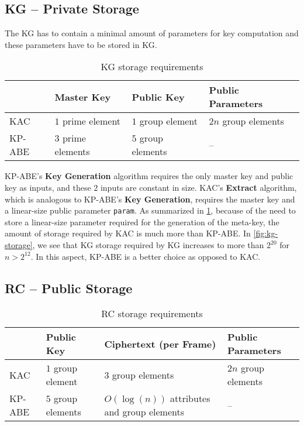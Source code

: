 \documentclass[hyp,a4paper,12pt,openbib]{socreport}
\begin{document}
\subsection{KG -- Private Storage}
\label{sec:kac-private}
The KG has to contain a minimal amount of parameters for key computation and these parameters have to be stored in KG. 


\begin{table}[H]
    \begin{tabular}{|l|l|l|l|}
    \hline
    ~      & Master Key      & Public Key & Public Parameters      \\ \hline
    KAC    & $1$ prime element &  $1$ group element & $2n$ group elements \\ \hline
    KP-ABE & $3$ prime elements & $5$ group elements & --                  \\ \hline
    \end{tabular}

    \caption{KG storage requirements}
        \label{tab:kg-storage}
\end{table}


KP-ABE's \textbf{Key Generation} algorithm requires the only master key and public key as inputs, and these $2$ inputs are constant in size. KAC's \textbf{Extract} algorithm, which is analogous to KP-ABE's \textbf{Key Generation}, requires the master key and a linear-size public parameter \texttt{param}. As summarized in \cref{tab:kg-storage}, because of the need to store a linear-size parameter required for the generation of the meta-key, the amount of storage required by KAC is much more than KP-ABE. In \cref{fig:kg-storage}, we see that KG storage required by KG increases to more than $2^{20}$ for $n>2^{12}$. In this aspect, KP-ABE is a better choice as opposed to KAC.


\subsection{RC -- Public Storage}
\label{sec:kac-public}

\begin{table}[H]
    \begin{tabular}{|l|l|l|l|}
    \hline
    ~      & Public Key        & Ciphertext (per Frame)                       & Public Parameters     \\ \hline
    KAC    & $1$ group element  & $3$ group elements                         & $2n$ group elements \\ \hline
    KP-ABE & $5$ group elements & $O(\log(n))$ attributes and group elements & --                  \\ \hline
    \end{tabular}
        \caption{RC storage requirements}
    \label{tab:rc-storage}
\end{table}
\end{document}
